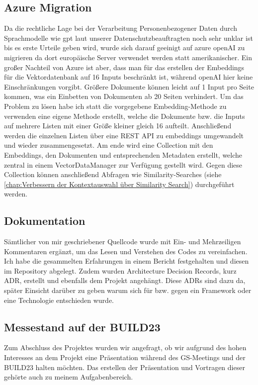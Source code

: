 \subsection{Azure Migration}
Da die rechtliche Lage bei der Verarbeitung Personenbezogener Daten durch Sprachmodelle wie gpt laut unserer
Datenschutzbeauftragten noch sehr unklar ist bis es erste Urteile geben wird, wurde sich darauf geeinigt auf azure
openAI zu migrieren da dort europäische Server verwendet werden statt amerikanischer. Ein großer Nachteil von Azure ist
aber, dass man für das erstellen der Embeddings für die Vektordatenbank auf 16 Inputs beschränkt ist, während openAI
hier keine Einschränkungen vorgibt. Größere Dokumente können leicht auf 1 Input pro Seite kommen, was ein Einbetten von
Dokumenten ab 20 Seiten verhindert. Um das Problem zu lösen habe ich statt die vorgegebene Embedding-Methode zu
verwenden eine eigene Methode erstellt, welche die Dokumente bzw. die Inputs auf mehrere Listen mit einer Größe kleiner
gleich 16 aufteilt. Anschließend werden die einzelnen Listen über eine REST API zu embeddings umgewandelt und wieder
zusammengesetzt. Am ende wird eine Collection mit den Embeddings, den Dokumenten und entsprechenden Metadaten erstellt,
welche zentral in einem VectorDataManager zur Verfügung gestellt wird. Gegen diese Collection können anschließend
Abfragen wie Similarity-Searches (siehe \ref{chap:Verbessern der Kontextauswahl über Similarity Search}) durchgeführt
werden. 

\subsection{Dokumentation}
Sämtlicher von mir geschriebener Quellcode wurde mit Ein- und Mehrzeiligen Kommentaren ergänzt, um das Lesen und
Verstehen des Codes zu vereinfachen. Ich habe die gesammelten Erfahrungen in einem Bericht festgehalten und diesen im
Repository abgelegt. Zudem wurden Architecture Decision Records, kurz ADR, erstellt und ebenfalls dem Projekt angehängt.
Diese ADRs sind dazu da, später Einsicht darüber zu geben warum sich für bzw. gegen ein Framework oder eine Technologie 
entschieden wurde. 

\subsection{Messestand auf der BUILD23}

Zum Abschluss des Projektes wurden wir angefragt, ob wir 
aufgrund des hohen Interesses an dem Projekt eine Präsentation während des GS-Meetings und der BUILD23 halten möchten. 
Das erstellen der Präsentation und Vortragen dieser gehörte auch zu meinem Aufgabenbereich.


